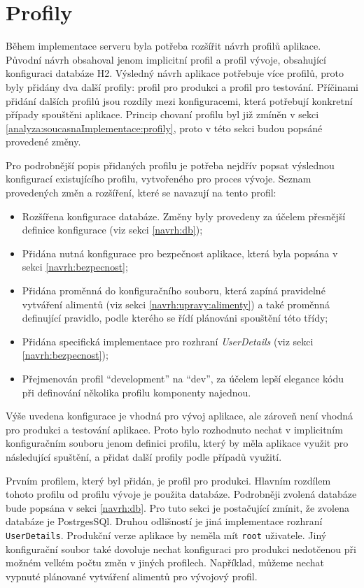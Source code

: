 \section{Profily}\label{navrh:profily}
    Během implementace serveru byla potřeba rozšířit návrh profilů aplikace. Původní návrh obsahoval jenom implicitní profil a profil vývoje, obsahující konfiguraci databáze H2. Výsledný návrh aplikace potřebuje více profilů, proto byly přidány dva další profily: profil pro produkci a profil pro testování. Příčinami přidání dalších profilů jsou rozdíly mezi konfiguracemi, která potřebují konkretní případy spouštěni aplikace. Princip chovaní profilu byl již zmíněn v sekci \ref{analyza:soucasnaImplementace:profily}, proto v této sekci budou popsáné provedené změny.
    
    Pro podrobnější popis přidaných profilu je potřeba nejdřív popsat výslednou konfigurací existujícího profilu, vytvořeného pro proces vývoje. Seznam provedených změn a rozšíření, které se navazují na tento profil:
    \begin{itemize}
            \item Rozšířena konfigurace databáze. Změny byly provedeny za účelem přesnější definice konfigurace (viz sekci \ref{navrh:db});
            \item Přidána nutná konfigurace pro bezpečnost aplikace, která byla popsána v sekci \ref{navrh:bezpecnost};
            \item Přidána proměnná do konfiguračního souboru, která zapíná pravidelné vytváření alimentů (viz sekci \ref{navrh:upravy:alimenty}) a také proměnná definující pravidlo, podle kterého se řídí plánováni spouštění této třídy;
            \item Přidána specifická implementace pro rozhraní \textit{UserDetails} (viz sekci \ref{navrh:bezpecnost});
            \item Přejmenován profil \enquote{development} na \enquote{dev}, za účelem lepší elegance kódu při definování několika profilu komponenty najednou.
    \end{itemize}
    
    Výše uvedena konfigurace je vhodná pro vývoj aplikace, ale zároveň není vhodná pro produkci a testování aplikace. Proto bylo rozhodnuto nechat v implicitním konfiguračním souboru jenom definici profilu, který by měla aplikace využit pro následující spuštění, a přidat další profily podle případů využití.
    
    Prvním profilem, který byl přidán, je profil pro produkci. Hlavním rozdílem tohoto profilu od profilu vývoje je použita databáze. Podrobněji zvolená databáze bude popsána v sekci \ref{navrh:db}. Pro tuto sekci je postačující zmínit, že zvolena databáze je PostrgesSQl. Druhou odlišností je jiná implementace rozhraní \verb|UserDetails|. Produkční verze aplikace by neměla mít \verb|root| uživatele. Jiný konfigurační soubor také dovoluje nechat konfiguraci pro produkci nedotčenou při možném velkém počtu změn v jiných profilech.
    Například, můžeme nechat vypnuté plánované vytváření alimentů pro vývojový profil.
    
